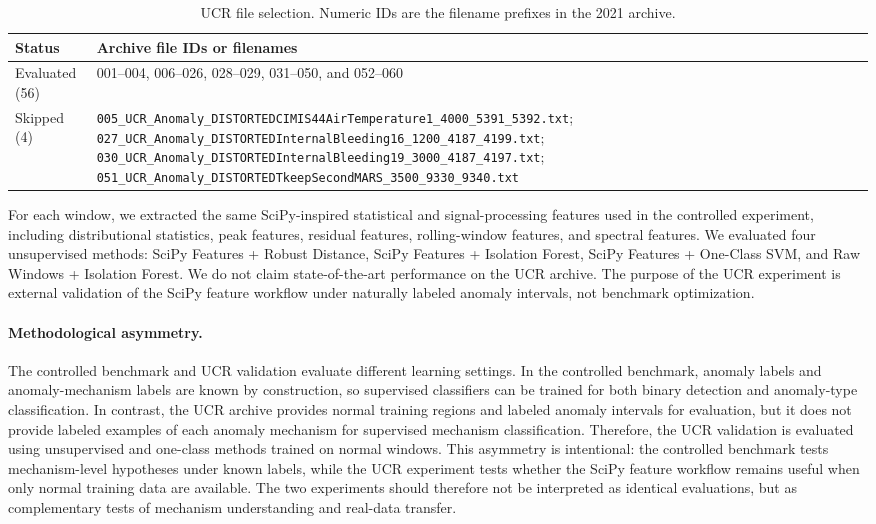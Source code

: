 \begin{table}[htbp]
\centering
\caption{UCR file selection. Numeric IDs are the filename prefixes in the 2021 archive.}
\label{tab:ucr-file-selection}
\small
\begin{tabular}{p{}p{}}
\toprule
\textbf{Status} & \textbf{Archive file IDs or filenames} \\
\midrule
Evaluated (56) & 001--004, 006--026, 028--029, 031--050, and 052--060 \\
Skipped (4) &
\texttt{005\_UCR\_Anomaly\_DISTORTEDCIMIS44AirTemperature1\_4000\_5391\_5392.txt};
\texttt{027\_UCR\_Anomaly\_DISTORTEDInternalBleeding16\_1200\_4187\_4199.txt};
\texttt{030\_UCR\_Anomaly\_DISTORTEDInternalBleeding19\_3000\_4187\_4197.txt};
\texttt{051\_UCR\_Anomaly\_DISTORTEDTkeepSecondMARS\_3500\_9330\_9340.txt} \\
\bottomrule
\end{tabular}
\end{table}

For each window, we extracted the same SciPy-inspired statistical and signal-processing features used in the controlled experiment, including distributional statistics, peak features, residual features, rolling-window features, and spectral features. We evaluated four unsupervised methods: SciPy Features + Robust Distance, SciPy Features + Isolation Forest, SciPy Features + One-Class SVM, and Raw Windows + Isolation Forest. We do not claim state-of-the-art performance on the UCR archive. The purpose of the UCR experiment is external validation of the SciPy feature workflow under naturally labeled anomaly intervals, not benchmark optimization.

\paragraph{Methodological asymmetry.}
The controlled benchmark and UCR validation evaluate different learning settings. In the controlled benchmark, anomaly labels and anomaly-mechanism labels are known by construction, so supervised classifiers can be trained for both binary detection and anomaly-type classification. In contrast, the UCR archive provides normal training regions and labeled anomaly intervals for evaluation, but it does not provide labeled examples of each anomaly mechanism for supervised mechanism classification. Therefore, the UCR validation is evaluated using unsupervised and one-class methods trained on normal windows. This asymmetry is intentional: the controlled benchmark tests mechanism-level hypotheses under known labels, while the UCR experiment tests whether the SciPy feature workflow remains useful when only normal training data are available. The two experiments should therefore not be interpreted as identical evaluations, but as complementary tests of mechanism understanding and real-data transfer.


